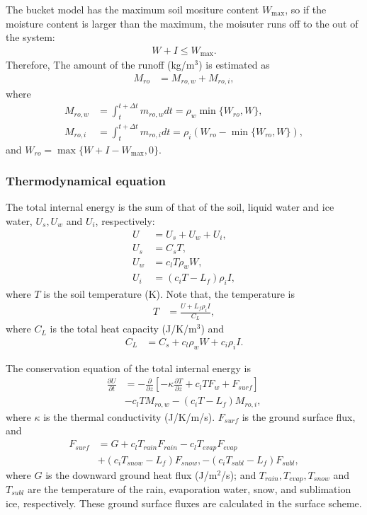 The bucket model has the maximum soil mositure content $W_\mathrm{max}$, so if the moisture content is larger than the maximum, the moisuter runs off to the out of the system:
\begin{align}
 W + I \le W_\mathrm{max}.
\end{align}
Therefore, The amount of the runoff (kg/m$^3$) is estimated as
\begin{align}
 M_{ro} &= M_{ro,w} + M_{ro,i},
\end{align}
where
\begin{align}
 M_{ro,w} &= \int_t^{t+ \Delta t} m_{ro,w} dt = \rho_w \min\{W_{ro},W\}, \\
 M_{ro,i} &= \int_t^{t+ \Delta t} m_{ro,i} dt = \rho_i (W_{ro} - \min\{W_{ro},W\}),
\end{align}
and $W_{ro} = \max\{W + I - W_\mathrm{max}, 0\}$.

  

\subsubsection{Thermodynamical equation}

The total internal energy is the sum of that of the soil, liquid water and ice water, $U_s, U_w$ and $U_i$, respectively:
\begin{align}
 U &= U_s + U_w + U_i, \\
 U_s &= C_s T, \\
 U_w &= c_l T \rho_w W, \\
 U_i &= ( c_i T - L_f ) \rho_i I,
\end{align}
where $T$ is the soil temperature (K).
Note that, the temperature is
\begin{align}
 T &= \frac{U + L_f \rho_i I }{C_L},
\end{align}
where $C_L$ is the total heat capacity (J/K/m$^3$) and
\begin{align}
 C_L &= C_s + c_l \rho_w W + c_i \rho_i I.
\end{align}


The conservation equation of the total internal energy is
\begin{align}
 \frac{\partial U}{\partial t} &=
 - \frac{\partial}{\partial z} \left[
   - \kappa \frac{\partial T}{\partial z}
   + c_l T F_w  + F_{surf} \right]  \nonumber \\ &
 - c_l T M_{ro,w}
 - ( c_i T - L_f ) M_{ro,i}, \label{eq:UDt}
\end{align}
where $\kappa$ is the thermal conductivity (J/K/m/s).
$F_{surf}$ is the ground surface flux, and
\begin{align}
 F_{surf} &= G
 + c_l T_{rain} F_{rain}
 - c_l T_{evap} F_{evap} \nonumber \\&
 + ( c_i T_{snow} - L_f ) F_{snow},
 - ( c_i T_{subl} - L_f ) F_{subl},
\end{align}
where $G$ is the downward ground heat flux (J/m$^2$/s); and $T_{rain}, T_{evap}, T_{snow}$ and $T_{subl}$ are the temperature of the rain, evaporation water, snow, and sublimation ice, respectively.
These ground surface fluxes are calculated in the surface scheme.


